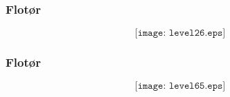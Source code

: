 \documentclass[aspectratio=169,xcolor=dvipsnames]{beamer}
\begin{document}
%
\begin{frame}
	\frametitle{Flotør}

$$\texttt{[image: level26.eps]}$$
\end{frame}
%
%
%
%
\begin{frame}
	\frametitle{Flotør}

$$\texttt{[image: level65.eps]}$$
\end{frame}
%
%
%
%
%
%
\end{document}
